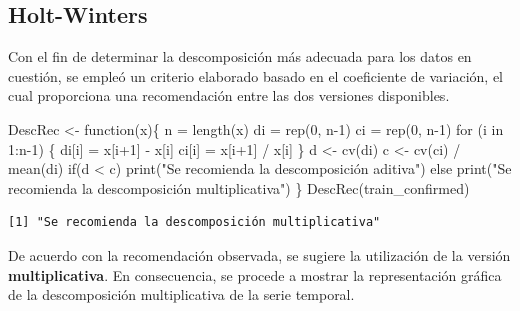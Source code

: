 \documentclass[
  letterpaper,
  DIV=11,
  numbers=noendperiod]{scrreport}
\newenvironment{Shaded}{\begin{snugshade}}{\end{snugshade}}
\newcommand{\ControlFlowTok}[1]{\textcolor[rgb]{0.00,0.23,0.31}{#1}}
\newcommand{\DecValTok}[1]{\textcolor[rgb]{0.68,0.00,0.00}{#1}}
\newcommand{\FunctionTok}[1]{\textcolor[rgb]{0.28,0.35,0.67}{#1}}
\newcommand{\NormalTok}[1]{\textcolor[rgb]{0.00,0.23,0.31}{#1}}
\newcommand{\OtherTok}[1]{\textcolor[rgb]{0.00,0.23,0.31}{#1}}
\newcommand{\SpecialCharTok}[1]{\textcolor[rgb]{0.37,0.37,0.37}{#1}}
\newcommand{\StringTok}[1]{\textcolor[rgb]{0.13,0.47,0.30}{#1}}
\theoremstyle{plain}
\theoremstyle{definition}
\theoremstyle{definition}
\theoremstyle{plain}
\theoremstyle{remark}
\begin{document}
\subsection{Holt-Winters}\label{sec-holt-winters}

Con el fin de determinar la descomposición más adecuada para los datos
en cuestión, se empleó un criterio elaborado basado en el coeficiente de
variación, el cual proporciona una recomendación entre las dos versiones
disponibles.

\begin{Shaded}
\begin{Highlighting}[]
\NormalTok{DescRec }\OtherTok{\textless{}{-}} \ControlFlowTok{function}\NormalTok{(x)\{}
\NormalTok{  n }\OtherTok{=} \FunctionTok{length}\NormalTok{(x)}
\NormalTok{  di }\OtherTok{=} \FunctionTok{rep}\NormalTok{(}\DecValTok{0}\NormalTok{, n}\DecValTok{{-}1}\NormalTok{)}
\NormalTok{  ci }\OtherTok{=} \FunctionTok{rep}\NormalTok{(}\DecValTok{0}\NormalTok{, n}\DecValTok{{-}1}\NormalTok{)}
  \ControlFlowTok{for}\NormalTok{ (i }\ControlFlowTok{in} \DecValTok{1}\SpecialCharTok{:}\NormalTok{n}\DecValTok{{-}1}\NormalTok{) \{}
\NormalTok{    di[i] }\OtherTok{=}\NormalTok{ x[i}\SpecialCharTok{+}\DecValTok{1}\NormalTok{] }\SpecialCharTok{{-}}\NormalTok{ x[i]}
\NormalTok{    ci[i] }\OtherTok{=}\NormalTok{ x[i}\SpecialCharTok{+}\DecValTok{1}\NormalTok{] }\SpecialCharTok{/}\NormalTok{ x[i]}
\NormalTok{  \}}
\NormalTok{  d }\OtherTok{\textless{}{-}} \FunctionTok{cv}\NormalTok{(di) }
\NormalTok{  c }\OtherTok{\textless{}{-}} \FunctionTok{cv}\NormalTok{(ci) }\SpecialCharTok{/} \FunctionTok{mean}\NormalTok{(di)}
  \ControlFlowTok{if}\NormalTok{(d }\SpecialCharTok{\textless{}}\NormalTok{ c)}
    \FunctionTok{print}\NormalTok{(}\StringTok{"Se recomienda la descomposición aditiva"}\NormalTok{)}
  \ControlFlowTok{else}
    \FunctionTok{print}\NormalTok{(}\StringTok{"Se recomienda la descomposición multiplicativa"}\NormalTok{)}
\NormalTok{\}}
\FunctionTok{DescRec}\NormalTok{(train\_confirmed)}
\end{Highlighting}
\end{Shaded}

\begin{verbatim}
[1] "Se recomienda la descomposición multiplicativa"
\end{verbatim}

De acuerdo con la recomendación observada, se sugiere la utilización de
la versión \textbf{multiplicativa}. En consecuencia, se procede a
mostrar la representación gráfica de la descomposición multiplicativa de
la serie temporal.
\end{document}
